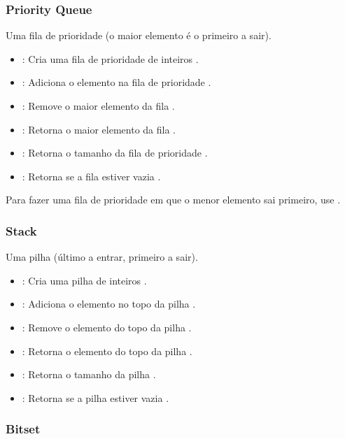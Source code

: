 \subsubsection{Priority Queue}

Uma fila de prioridade (o maior elemento é o primeiro a sair).
\begin{itemize}\setlength\itemsep{0pt}
    \item {}: Cria uma fila de prioridade de inteiros .
    \item {}: Adiciona o elemento  na fila de prioridade .
    \item {}: Remove o maior elemento da fila .
    \item {}: Retorna o maior elemento da fila .
    \item {}: Retorna o tamanho da fila de prioridade .
    \item {}: Retorna  se a fila estiver vazia .
\end{itemize}

Para fazer uma fila de prioridade em que o menor elemento sai primeiro, use .

\subsubsection{Stack}

Uma pilha (último a entrar, primeiro a sair).
\begin{itemize}\setlength\itemsep{0pt}
    \item {}: Cria uma pilha de inteiros .
    \item {}: Adiciona o elemento  no topo da pilha .
    \item {}: Remove o elemento do topo da pilha .
    \item {}: Retorna o elemento do topo da pilha .
    \item {}: Retorna o tamanho da pilha .
    \item {}: Retorna  se a pilha estiver vazia .
\end{itemize}

\subsubsection{Bitset}

